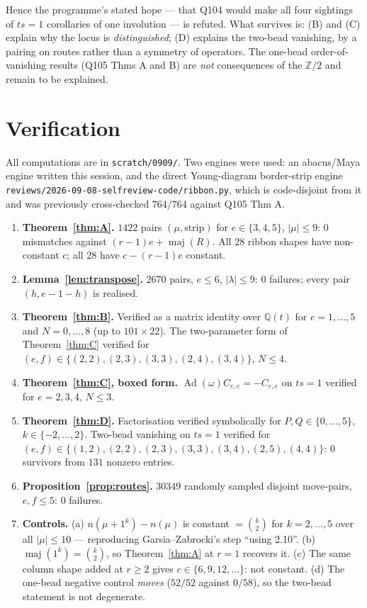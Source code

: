 \documentclass[11pt]{article}
\theoremstyle{definition}
\DeclareMathOperator{\maj}{maj}
\newcommand{\Z}{\mathbb{Z}}
\newcommand{\Q}{\mathbb{Q}}
\newcommand{\Ad}{\operatorname{Ad}}
\begin{document}
Hence the programme's stated hope --- that Q104 would make all four sightings of
$ts=1$ corollaries of one involution --- is refuted.  What survives is: (B) and (C)
explain why the locus is \emph{distinguished}; (D) explains the two-bead vanishing,
by a pairing on routes rather than a symmetry of operators.  The one-bead order-of-
vanishing results (Q105 Thms A and B) are \emph{not} consequences of the $\Z/2$ and
remain to be explained.

\section{Verification}

All computations are in \texttt{scratch/0909/}.  Two engines were used: an
abacus/Maya engine written this session, and the direct Young-diagram border-strip
engine \texttt{reviews/2026-09-08-selfreview-code/ribbon.py}, which is code-disjoint
from it and was previously cross-checked $764/764$ against Q105 Thm A.

\begin{enumerate}
\item \textbf{Theorem~\ref{thm:A}.} $1422$ pairs $(\mu,\text{strip})$ for
$e\in\{3,4,5\}$, $|\mu|\le9$: $0$ mismatches against $(r-1)e+\maj(R)$.  All $28$
ribbon shapes have non-constant $c$; all $28$ have $c-(r-1)e$ constant.
\item \textbf{Lemma~\ref{lem:transpose}.} $2670$ pairs, $e\le6$, $|\lambda|\le9$:
$0$ failures; every pair $(h,e-1-h)$ is realised.
\item \textbf{Theorem~\ref{thm:B}.} Verified as a matrix identity over $\Q(t)$ for
$e=1,\dots,5$ and $N=0,\dots,8$ (up to $101\times22$).  The two-parameter form of
Theorem~\ref{thm:C} verified for $(e,f)\in\{(2,2),(2,3),(3,3),(2,4),(3,4)\}$,
$N\le4$.
\item \textbf{Theorem~\ref{thm:C}, boxed form.} $\Ad(\omega)C_{e,e}=-C_{e,e}$ on
$ts=1$ verified for $e=2,3,4$, $N\le3$.
\item \textbf{Theorem~\ref{thm:D}.} Factorisation verified symbolically for
$P,Q\in\{0,\dots,5\}$, $k\in\{-2,\dots,2\}$.  Two-bead vanishing on $ts=1$ verified
for $(e,f)\in\{(1,2),(2,2),(2,3),(3,3),(3,4),(2,5),(4,4)\}$: $0$ survivors from
$131$ nonzero entries.
\item \textbf{Proposition~\ref{prop:routes}.} $30349$ randomly sampled disjoint
move-pairs, $e,f\le5$: $0$ failures.
\item \textbf{Controls.}  (a) $n(\mu+1^k)-n(\mu)$ is constant $=\binom k2$ for
$k=2,\dots,5$ over all $|\mu|\le10$ --- reproducing Garsia--Zabrocki's step ``using
2.10''.  (b) $\maj(1^k)=\binom k2$, so Theorem~\ref{thm:A} at $r=1$ recovers it.
(c) The same column shape added at $r\ge2$ gives $c\in\{6,9,12,\dots\}$: not
constant.  (d) The one-bead negative control \emph{moves} ($52/52$ against $0/58$),
so the two-bead statement is not degenerate.
\end{enumerate}
\end{document}
